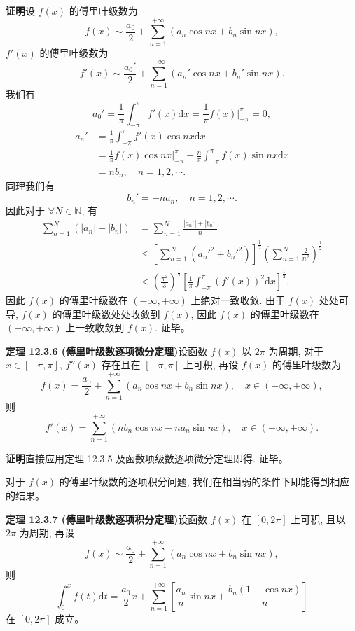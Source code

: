 \documentclass[UTF8, 12pt, fontset=fandol, oneside]{ctexart}
\begin{document}
\noindent\textbf{证明}\quad 设 $f(x)$ 的傅里叶级数为
\[
  f(x)\sim\frac{a_0}{2}+\sum_{n=1}^{+\infty}(a_n\cos nx+b_n\sin nx),
\]
$f'(x)$ 的傅里叶级数为
\[
  f'(x)\sim\frac{a_0'}{2}+\sum_{n=1}^{+\infty}(a_n'\cos nx+b_n'\sin nx).
\]
我们有
\[
  a_0'=\frac1\pi\int_{-\pi}^{\pi}f'(x)\mathrm dx
  =\frac1\pi f(x)\bigg|_{-\pi}^{\pi}=0,
\]
\[
\begin{aligned}
  a_n'
  &=\frac1\pi\int_{-\pi}^{\pi}f'(x)\cos nx\mathrm dx\\
  &=\frac1\pi f(x)\cos nx\bigg|_{-\pi}^{\pi}
    +\frac n\pi\int_{-\pi}^{\pi}f(x)\sin nx\mathrm dx\\
  &=nb_n,\quad n=1,2,\cdots.
\end{aligned}
\]
同理我们有
\[
  b_n'=-na_n,\quad n=1,2,\cdots.
\]
因此对于 $\forall N\in\mathbb N$, 有
\[
\begin{aligned}
  \sum_{n=1}^N(|a_n|+|b_n|)
  &=\sum_{n=1}^N\frac{|a_n'|+|b_n'|}{n}\\
  &\leqslant
  \left[\sum_{n=1}^N(a_n'^2+b_n'^2)\right]^{\frac12}
  \left(\sum_{n=1}^N\frac2{n^2}\right)^{\frac12}\\
  &<\left(\frac{\pi^2}{3}\right)^{\frac12}
  \left[\frac1\pi\int_{-\pi}^{\pi}(f'(x))^2\mathrm dx\right]^{\frac12}.
\end{aligned}
\]
因此 $f(x)$ 的傅里叶级数在 $(-\infty,+\infty)$ 上绝对一致收敛. 由于 $f(x)$ 处处可导, $f(x)$ 的傅里叶级数处处收敛到 $f(x)$, 因此 $f(x)$ 的傅里叶级数在 $(-\infty,+\infty)$ 上一致收敛到 $f(x)$. 证毕。

\noindent\textbf{定理 12.3.6 (傅里叶级数逐项微分定理)}\quad 设函数 $f(x)$ 以 $2\pi$ 为周期, 对于 $x\in[-\pi,\pi]$, $f''(x)$ 存在且在 $[-\pi,\pi]$ 上可积, 再设 $f(x)$ 的傅里叶级数为
\[
  f(x)=\frac{a_0}{2}+\sum_{n=1}^{+\infty}(a_n\cos nx+b_n\sin nx),\quad x\in(-\infty,+\infty),
\]
则
\[
  f'(x)=\sum_{n=1}^{+\infty}(nb_n\cos nx-na_n\sin nx),\quad x\in(-\infty,+\infty).
\]

\noindent\textbf{证明}\quad 直接应用定理 12.3.5 及函数项级数逐项微分定理即得. 证毕。

对于 $f(x)$ 的傅里叶级数的逐项积分问题, 我们在相当弱的条件下即能得到相应的结果。

\noindent\textbf{定理 12.3.7 (傅里叶级数逐项积分定理)}\quad 设函数 $f(x)$ 在 $[0,2\pi]$ 上可积, 且以 $2\pi$ 为周期, 再设
\[
  f(x)\sim\frac{a_0}{2}+\sum_{n=1}^{+\infty}(a_n\cos nx+b_n\sin nx),
\]
则
\[
  \int_0^xf(t)\mathrm dt
  =
  \frac{a_0}{2}x+\sum_{n=1}^{+\infty}
  \left[
    \frac{a_n}{n}\sin nx+\frac{b_n(1-\cos nx)}{n}
  \right]
\]
在 $[0,2\pi]$ 成立。
\end{document}
